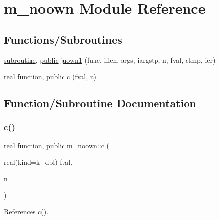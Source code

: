 \hypertarget{namespacem__noown}{}\section{m\+\_\+noown Module Reference}
\label{namespacem__noown}
\subsection*{Functions/\+Subroutines}
\begin{DoxyCompactItemize}
\item 
\hyperlink{M__stopwatch_83_8txt_acfbcff50169d691ff02d4a123ed70482}{subroutine}, \hyperlink{M__stopwatch_83_8txt_a2f74811300c361e53b430611a7d1769f}{public} \hyperlink{namespacem__noown_a9621366886f977a10fd7804c91054c6d}{juown1} (func, iflen, args, iargstp, n, fval, ctmp, ier)
\item 
\hyperlink{read__watch_83_8txt_abdb62bde002f38ef75f810d3a905a823}{real} function, \hyperlink{M__stopwatch_83_8txt_a2f74811300c361e53b430611a7d1769f}{public} \hyperlink{namespacem__noown_ad499ba6364622c755e4ad04bc2bfa4a3}{c} (fval, n)
\end{DoxyCompactItemize}


\subsection{Function/\+Subroutine Documentation}
\mbox{\label{namespacem__noown_ad499ba6364622c755e4ad04bc2bfa4a3}} 
\subsubsection{\texorpdfstring{c()}{c()}}
{\footnotesize\ttfamily \hyperlink{read__watch_83_8txt_abdb62bde002f38ef75f810d3a905a823}{real} function, \hyperlink{M__stopwatch_83_8txt_a2f74811300c361e53b430611a7d1769f}{public} m\+\_\+noown\+::c (\begin{DoxyParamCaption}\item[{\hyperlink{read__watch_83_8txt_abdb62bde002f38ef75f810d3a905a823}{real}(kind=k\+\_\+dbl)}]{fval,  }\item[{}]{n }\end{DoxyParamCaption})}



References c().

